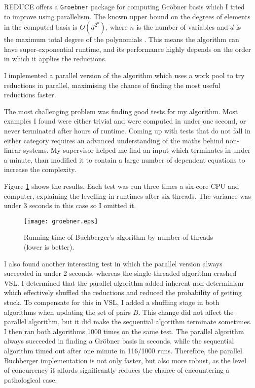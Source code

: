 REDUCE offers a \verb|Groebner| package for computing Gröbner basis which I tried
to improve using parallelism. The known upper bound on the degrees of elements
in the computed basis is $O(d^{2^n})$, where $n$ is the number of variables
and $d$ is the maximum total degree of the polynomials \cite{MAYR}. This means the
algorithm can have super-exponential runtime, and its performance highly
depends on the order in which it applies the reductions.

I implemented a parallel version of the algorithm which uses a work
pool to try reductions in parallel, maximising the chance of finding the most useful reductions
faster.

The most challenging problem was finding good tests for my algorithm.
Most examples I found were either trivial and were computed in under one
second, or never terminated after hours of runtime. Coming up with
tests that do not fall in either category requires an advanced understanding
of the maths behind non-linear systems. My supervisor helped me
find an input which terminates in under a minute, than modified it
to contain a large number of dependent equations to increase the complexity.

Figure \ref{fig:groebner} shows the results. Each test was run three times
a six-core CPU and computer, explaining the levelling in runtimes after
six threads. The variance was under 3 seconds in this case so I omitted it.

\begin{figure}[H]
  \centering
  \texttt{[image: groebner.eps]}
  \caption{Running time of Buchberger's algorithm by number of threads (lower is better).}
  \label{fig:groebner}
\end{figure}

I also found another interesting test in which the parallel version
always succeeded in under 2 seconds, whereas the single-threaded algorithm
crashed VSL. I determined that the parallel algorithm added inherent
non-determinism which effectively shuffled the reductions and
reduced the probability of getting stuck.
To compensate for this in VSL, I added a shuffling stage in both algorithms
when updating the set of pairs $B$. This change did not affect the parallel
algorithm, but it did make the sequential algorithm terminate sometimes.
I then ran both algorithms 1000 times on the same test. The parallel
algorithm always succeeded in finding a Gröbner basis in seconds,
while the sequential algorithm timed out after one minute in 116/1000 runs.
Therefore, the parallel Buchberger implementation is not only faster,
but also more robust, as the level of concurrency it affords significantly
reduces the chance of encountering a pathological case.

